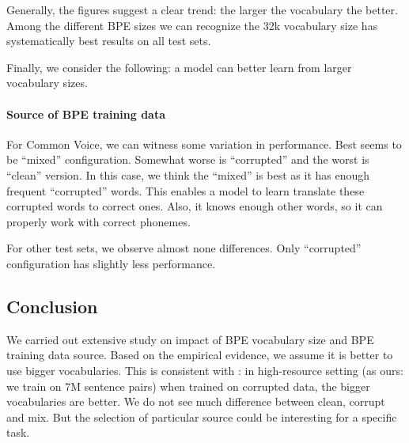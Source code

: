 Generally, the figures suggest a clear trend: the larger the vocabulary the better. Among the different BPE sizes we can recognize the 32k vocabulary size has systematically best results on all test sets.

Finally, we consider the following: a model can better learn from larger vocabulary sizes. 

\paragraph{Source of BPE training data}
For Common Voice, we can witness some variation in performance. Best seems to be ``mixed'' configuration. Somewhat worse is ``corrupted'' and the worst is ``clean'' version. In this case, we think the ``mixed'' is best as it has enough frequent ``corrupted'' words. This enables a model to learn translate these corrupted words to correct ones. Also, it knows enough other words, so it can properly work with correct phonemes.

For other test sets, we observe almost none differences. Only ``corrupted'' configuration has slightly less performance. 


\subsection{Conclusion}
We carried out extensive study on impact of BPE vocabulary size and BPE training data source. Based on the empirical evidence, we assume it is better to use bigger vocabularies. This is consistent with : in high-resource setting (as ours: we train on 7M sentence pairs) when trained on corrupted data, the bigger vocabularies are better. We do not see much difference between clean, corrupt and mix. But the selection of particular source could be interesting for a specific task.

